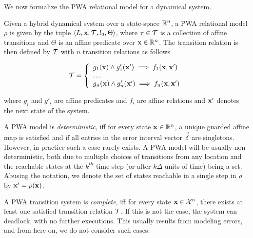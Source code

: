 
We now formalize the PWA relational model for a dynamical system.
\begin{definition}

Given a hybrid dynamical system over a state-space $\mathbb{R}^n$, a PWA
relational model $\rho$ is given by the tuple
$\left\langle L,\mathbf{x},\mathcal{T},l_0,\Theta \right \rangle$, where $\tau \in \mathcal{T}$ is a
collection of affine transitions  and $\Theta$ is an affine predicate
over $\mathbf{x}\in\mathbb{R}^n$. The transition relation is then defined by
$\mathcal{T}$ with $n$ transition relations as follows

\begin{equation}
    \mathcal{T} = \left\{
        \begin{array}{ll}
            g_1(\mathbf{x}) \land g'_1(\mathbf{x}') \implies f_1(\mathbf{x},\mathbf{x}') \\
            \ldots\\
            g_n(\mathbf{x}) \land g'_n(\mathbf{x}') \implies f_n(\mathbf{x},\mathbf{x}') \\
        \end{array}
    \right.
\end{equation}
\end{definition}

where $g_i$ and $g'_i$ are affine predicates and $f_i$ are affine
relations and $\mathbf{x}'$ denotes the next state of the system.

A PWA model is \textit{deterministic}, iff for every state
$\mathbf{x}\in\mathbb{R}^n$, a unique guarded affine map is satisfied and if all
entries in the error interval vector $\vec{\delta}$ are singletons.
However, in practice such a case rarely exists. A PWA model will be
usually non-deterministic, both due to multiple choices of transitions
from any location and the reachable states at the $k^{th}$ time step
(or after $k\Delta$ units of time) being a set.  Abusing the notation,
we denote the set of states reachable in a single step in $\rho$ by
$\mathbf{x}' = \rho(\mathbf{x})$.

A PWA transition system is \textit{complete}, iff for every state
$\mathbf{x}\in\mathcal{X}^n$, there exists at least one satisfied
transition relation $\mathcal{T}$. If this is not the case, the system can
deadlock, with no further executions. This usually results from
modeling errors, and from here on, we do not consider such
cases.


